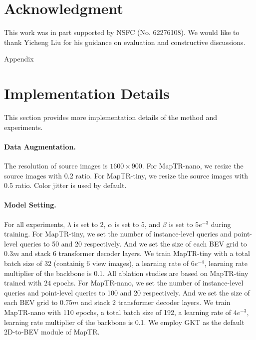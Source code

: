 \documentclass{article} \usepackage{iclr2023_conference,times}
\begin{document}
\section*{Acknowledgment}
This work was in part supported by NSFC (No. 62276108). We would like to thank Yicheng Liu for his guidance on evaluation and constructive discussions.







\newpage

\appendix
{\LARGE  Appendix}

\section{Implementation Details}
\label{sec:more_details}
This section provides more implementation details of the method and experiments.

\paragraph{Data Augmentation.}
The resolution of source images is $1600\times900$. For MapTR-nano, we resize the source images with $0.2$ ratio. For MapTR-tiny, we resize the source images with $0.5$ ratio. Color jitter is used by default.


\paragraph{Model Setting.}
For all experiments, $\lambda$ is set to $2$, $\alpha$ is set to $5$, and $\beta$ is set to $5e^{-3}$ during training. For MapTR-tiny, we set the number of instance-level queries and point-level queries to 50 and 20 respectively.
And  we set the size of each BEV grid to $0.3m$ and stack $6$ transformer decoder layers. We train MapTR-tiny with a total batch size of $32$ (containig 6 view images), a learning rate of $6e^{-4}$, learning rate multiplier of the backbone is 0.1. All ablation studies are based on MapTR-tiny trained with $24$ epochs.
For MapTR-nano, we set the number of instance-level queries and point-level queries to 100 and 20 respectively. And we set the size of each BEV grid to $0.75m$ and stack $2$ transformer decoder layers. We train MapTR-nano with 110 epochs, a total batch size of 192, a learning rate of $4e^{-3}$, learning rate multiplier of the backbone is 0.1. We employ GKT \citep{gkt} as the default 2D-to-BEV module  of MapTR.
\end{document}
